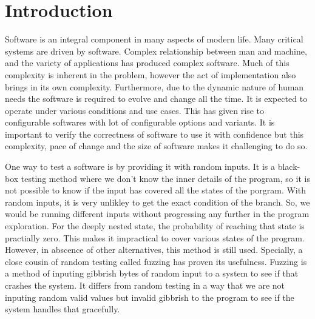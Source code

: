 \documentclass[	runningheads,
				a4paper]{llncs}
\begin{document}
\section{Introduction}
Software is an integral component in many aspects of modern life. Many critical systems are driven by software. Complex relationship between man and machine, and the variety of applications has produced complex software. Much of this complexity is inherent in the problem, however the act of implementation also brings in its own complexity. Furthermore, due to the dynamic nature of human needs the software is required to evolve and change all the time. It is expected to operate under various conditions and use cases. This has given rise to configurable softwares with lot of configurable options and variants. It is important to verify the correctness of software to use it with confidence but this complexity, pace of change and the size of software makes it challenging to do so.

One way to test a software is by providing it with random inputs. It is a black-box testing method where we don't know the inner details of the program, so it is not possible to know if the input has covered all the states of the porgram. With random inputs, it is very unlikley to get the exact condition of the branch. So, we would be running different inputs without progressing any further in the program exploration. For the deeply nested state, the probability of reaching that state is practially zero. This makes it impractical to cover various states of the program. However, in abscence of other alternatives, this method is still used. Specially, a close cousin of random testing called fuzzing \cite{miller1990empirical} has proven its usefulness. Fuzzing is a method of inputing gibbrish bytes of random input to a system to see if that crashes the system. It differs from random testing in a way that we are not inputing random valid values but invalid gibbrish to the program to see if the system handles that gracefully.
\end{document}
